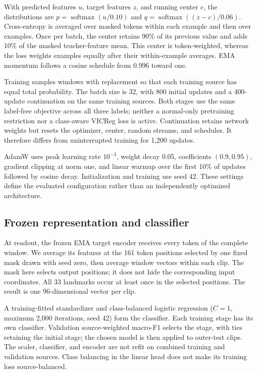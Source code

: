 \documentclass[10pt,twocolumn,letterpaper]{article}
\begin{document}
With predicted features $u$, target features $z$, and running center $c$, the distributions are $p=\operatorname{softmax}(u/0.10)$ and $q=\operatorname{softmax}((z-c)/0.06)$. Cross-entropy is averaged over masked tokens within each example and then over examples. Once per batch, the center retains 90\% of its previous value and adds 10\% of the masked teacher-feature mean. This center is token-weighted, whereas the loss weights examples equally after their within-example averages. EMA momentum follows a cosine schedule from 0.996 toward one.

Training samples windows with replacement so that each training source has equal total probability. The batch size is 32, with 800 initial updates and a 400-update continuation on the same training sources. Both stages use the same label-free objective across all three labels; neither a normal-only pretraining restriction nor a class-aware VICReg loss is active. Continuation retains network weights but resets the optimizer, center, random streams, and schedules. It therefore differs from uninterrupted training for 1,200 updates.

AdamW uses peak learning rate $10^{-3}$, weight decay 0.05, coefficients $(0.9,0.95)$, gradient clipping at norm one, and linear warmup over the first 10\% of updates followed by cosine decay. Initialization and training use seed 42. These settings define the evaluated configuration rather than an independently optimized architecture.

\subsection{Frozen representation and classifier}
At readout, the frozen EMA target encoder receives every token of the complete window. We average its features at the 161 token positions selected by one fixed mask drawn with seed zero, then average window vectors within each clip. The mask here selects output positions; it does not hide the corresponding input coordinates. All 33 landmarks occur at least once in the selected positions. The result is one 96-dimensional vector per clip.

A training-fitted standardizer and class-balanced logistic regression ($C=1$, maximum 2,000 iterations, seed 42) form the classifier. Each training stage has its own classifier. Validation source-weighted macro-F1 selects the stage, with ties retaining the initial stage; the chosen model is then applied to outer-test clips. The scaler, classifier, and encoder are not refit on combined training and validation sources. Class balancing in the linear head does not make its training loss source-balanced.
\end{document}
